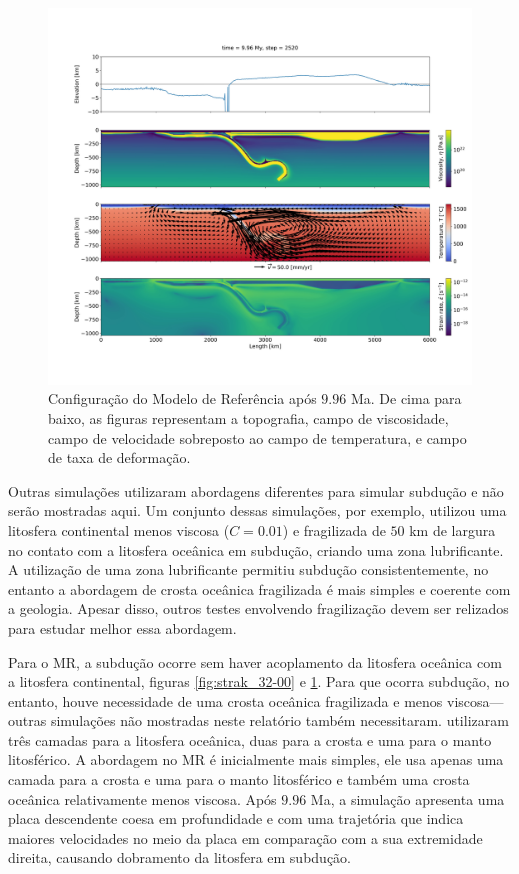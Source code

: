 \begin{figure}
    \centering
    \includegraphics[trim={5cm 14cm 2cm 12cm}, clip, width=1.0 \textwidth]{fig/strak_32-11.png}
    \caption{Configuração do Modelo de Referência após $9.96$ Ma. De cima para baixo, as figuras representam a topografia, campo de viscosidade, campo de velocidade sobreposto ao campo de temperatura, e campo de taxa de deformação.}
    \label{fig:strak_32-11}
\end{figure}

Outras simulações utilizaram abordagens diferentes para simular subdução e não serão mostradas aqui. Um conjunto dessas simulações, por exemplo, utilizou uma litosfera continental menos viscosa ($C=0.01$) e fragilizada de $50$ km de largura no contato com a litosfera oceânica em subdução, criando uma zona lubrificante. A utilização de uma zona lubrificante permitiu subdução consistentemente, no entanto a abordagem de crosta oceânica fragilizada é mais simples e coerente com a geologia. Apesar disso, outros testes envolvendo fragilização devem ser relizados para estudar melhor essa abordagem.

Para o MR, a subdução ocorre sem haver acoplamento da litosfera oceânica com a litosfera continental, figuras \ref{fig:strak_32-00} e \ref{fig:strak_32-11}. Para que ocorra subdução, no entanto, houve necessidade de uma crosta oceânica fragilizada e menos viscosa---outras simulações não mostradas neste relatório também necessitaram. \citet{strak2021thermo} utilizaram três camadas para a litosfera oceânica, duas para a crosta e uma para o manto litosférico. A abordagem no MR é inicialmente mais simples, ele usa apenas uma camada para a crosta e uma para o manto litosférico e também uma crosta oceânica relativamente menos viscosa. Após $9.96$ Ma, a simulação apresenta uma placa descendente coesa em profundidade e com uma trajetória que indica maiores velocidades no meio da placa em comparação com a sua extremidade direita, causando dobramento da litosfera em subdução.

